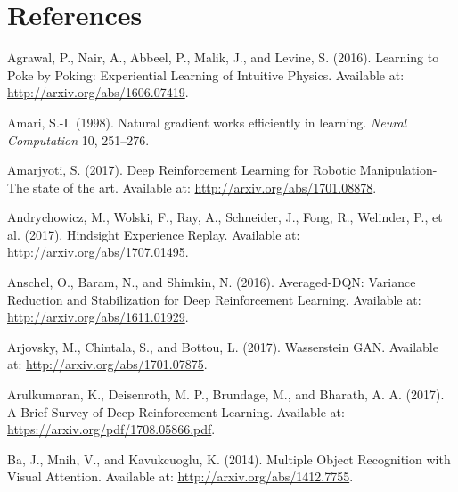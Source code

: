 \documentclass[
  letterpaper,
  DIV=11,
  numbers=noendperiod]{scrreprt}
\newlength{\cslhangindent}
\newlength{\cslentryspacingunit} %
\newenvironment{CSLReferences}[2] %
 {%
  \setlength{\parindent}{0pt}
  \ifodd #1
  \let\oldpar\par
  \def\par{\hangindent=\cslhangindent\oldpar}
  \fi
  \setlength{\parskip}{#2\cslentryspacingunit}
 }%
 {}
\begin{document}

\hypertarget{references}{%
\chapter*{References}\label{references}}


\hypertarget{refs}{}
\begin{CSLReferences}{1}{0}
\leavevmode{}%
Agrawal, P., Nair, A., Abbeel, P., Malik, J., and Levine, S. (2016).
Learning to {Poke} by {Poking}: {Experiential Learning} of {Intuitive
Physics}. Available at: \url{http://arxiv.org/abs/1606.07419}.

\leavevmode{}%
Amari, S.-I. (1998). Natural gradient works efficiently in learning.
\emph{Neural Computation} 10, 251--276.

\leavevmode{}%
Amarjyoti, S. (2017). Deep {Reinforcement Learning} for {Robotic
Manipulation-The} state of the art. Available at:
\url{http://arxiv.org/abs/1701.08878}.

\leavevmode{}%
Andrychowicz, M., Wolski, F., Ray, A., Schneider, J., Fong, R.,
Welinder, P., et al. (2017). Hindsight {Experience Replay}. Available
at: \url{http://arxiv.org/abs/1707.01495}.

\leavevmode{}%
Anschel, O., Baram, N., and Shimkin, N. (2016). Averaged-{DQN}:
{Variance Reduction} and {Stabilization} for {Deep Reinforcement
Learning}. Available at: \url{http://arxiv.org/abs/1611.01929}.

\leavevmode{}%
Arjovsky, M., Chintala, S., and Bottou, L. (2017). Wasserstein {GAN}.
Available at: \url{http://arxiv.org/abs/1701.07875}.

\leavevmode{}%
Arulkumaran, K., Deisenroth, M. P., Brundage, M., and Bharath, A. A.
(2017). A {Brief Survey} of {Deep Reinforcement Learning}. Available at:
\url{https://arxiv.org/pdf/1708.05866.pdf}.

\leavevmode{}%
Ba, J., Mnih, V., and Kavukcuoglu, K. (2014). Multiple {Object
Recognition} with {Visual Attention}. Available at:
\url{http://arxiv.org/abs/1412.7755}.


\end{CSLReferences}
\end{document}
